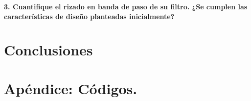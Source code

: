 \documentclass[12pt]{article}
\begin{document}
\textbf{3. Cuantifique el rizado en banda de paso de su filtro. ¿Se cumplen las características de diseño planteadas  inicialmente?}
\section{Conclusiones}


\section{Apéndice: Códigos.}
\end{document}
